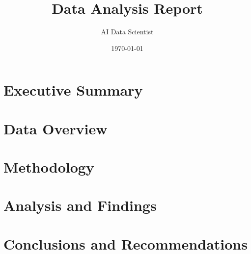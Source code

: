 \documentclass{article}
\title{\Large Data Analysis Report}
\author{AI Data Scientist}
\date{\today}
\begin{document}
\maketitle
\tableofcontents
\newpage

\section{Executive Summary}

\section{Data Overview}

\section{Methodology}

\section{Analysis and Findings}

\section{Conclusions and Recommendations}
\end{document}
